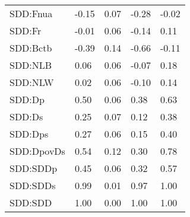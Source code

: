 \begin{center}
\begin{longtable}{|p{0.9in}|p{0.7in}|p{0.7in}|p{0.7in}|p{0.7in}|}
  SDD:Fnua & -0.15 & 0.07 & -0.28 & -0.02 \\ 
  SDD:Fr & -0.01 & 0.06 & -0.14 & 0.11 \\ 
  SDD:Bctb & -0.39 & 0.14 & -0.66 & -0.11 \\ 
  SDD:NLB & 0.06 & 0.06 & -0.07 & 0.18 \\ 
  SDD:NLW & 0.02 & 0.06 & -0.10 & 0.14 \\ 
  SDD:Dp & 0.50 & 0.06 & 0.38 & 0.63 \\ 
  SDD:Ds & 0.25 & 0.07 & 0.12 & 0.38 \\ 
  SDD:Dps & 0.27 & 0.06 & 0.15 & 0.40 \\ 
  SDD:DpovDs & 0.54 & 0.12 & 0.30 & 0.78 \\ 
  SDD:SDDp & 0.45 & 0.06 & 0.32 & 0.57 \\ 
  SDD:SDDs & 0.99 & 0.01 & 0.97 & 1.00 \\ 
  SDD:SDD & 1.00 & 0.00 & 1.00 & 1.00 \\ 
   \hline
\end{longtable}
\end{center}
%

